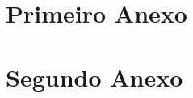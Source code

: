 \documentclass[english]{ist-thesis}
\begin{document}
\printbibliography[heading = bibintoc]

\appendix

\chapter{Primeiro Anexo}

\lipsum

\chapter{Segundo Anexo}

\lipsum

\makespine
\end{document}
